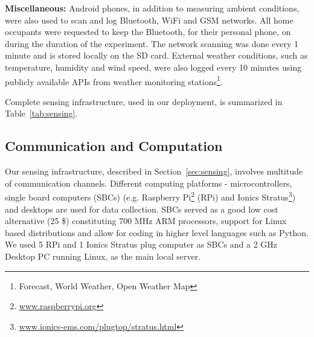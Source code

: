 \documentclass[10pt]{sensys-proc}
\newcommand{\secref}[1]{Section~\ref{#1}}
\newcommand{\tabref}[1]{Table~\ref{#1}}
\begin{document}
\noindent \textbf{Miscellaneous:} Android phones, in addition to measuring ambient conditions, were also used to scan and log Bluetooth, WiFi and GSM networks. All home occupants were requested to keep the Bluetooth, for their personal phone, on during the duration of the experiment. The network scanning was done every 1 minute and is stored locally on the SD card. External weather conditions, such as temperature, humidity and wind speed, were also logged every 10 minutes using publicly available APIs from weather monitoring stations\footnote{Forecast, World Weather, Open Weather Map}.


Complete sensing infrastructure, used in our deployment, is summarized in \tabref{tab:sensing}.


\subsection{Communication and Computation}
Our sensing infrastructure, described in \secref{sec:sensing}, involves multitude of communication channels. Different computing platforms - microcontrollers, single board computers (SBCs) (e.g. Raspberry Pi\footnote{\url{www.raspberrypi.org}} (RPi) and Ionics Stratus\footnote{\url{www.ionics-ems.com/plugtop/stratus.html}}) and desktops are used for data collection.  
SBCs served as a good low cost alternative (25 \$) constituting 700 MHz ARM processors, support for Linux based distributions and allow for coding in higher level languages such as Python. %
We used 5 RPi and 1 Ionics Stratus plug computer as SBCs and a 2 GHz Desktop PC running Linux, as the main local server.
\end{document}
